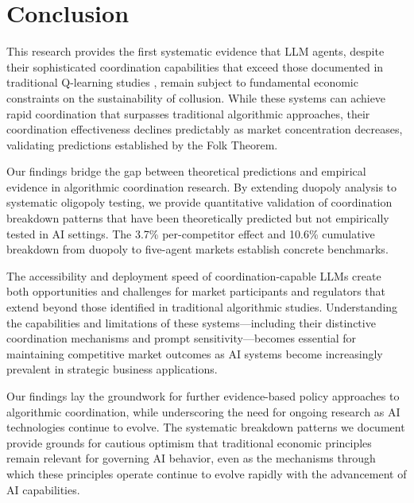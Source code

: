 \section{Conclusion}\label{sec:con}
% 
% 

This research provides the first systematic evidence that LLM agents, despite their sophisticated coordination capabilities that exceed those documented in traditional Q-learning studies \parencite{calvano_artificial_2020, klein_autonomous_2021}, remain subject to fundamental economic constraints on the sustainability of collusion. While these systems can achieve rapid coordination that surpasses traditional algorithmic approaches, their coordination effectiveness declines predictably as market concentration decreases, validating predictions established by the Folk Theorem.

Our findings bridge the gap between theoretical predictions and empirical evidence in algorithmic coordination research. By extending \textcite{fish_algorithmic_2025} duopoly analysis to systematic oligopoly testing, we provide quantitative validation of coordination breakdown patterns that have been theoretically predicted but not empirically tested in AI settings. The 3.7\% per-competitor effect and 10.6\% cumulative breakdown from duopoly to five-agent markets establish concrete benchmarks.

The accessibility and deployment speed of coordination-capable LLMs create both opportunities and challenges for market participants and regulators that extend beyond those identified in traditional algorithmic studies. Understanding the capabilities and limitations of these systems---including their distinctive coordination mechanisms and prompt sensitivity—becomes essential for maintaining competitive market outcomes as AI systems become increasingly prevalent in strategic business applications.

Our findings lay the groundwork for further evidence-based policy approaches to algorithmic coordination, while underscoring the need for ongoing research as AI technologies continue to evolve. The systematic breakdown patterns we document provide grounds for cautious optimism that traditional economic principles remain relevant for governing AI behavior, even as the mechanisms through which these principles operate continue to evolve rapidly with the advancement of AI capabilities.